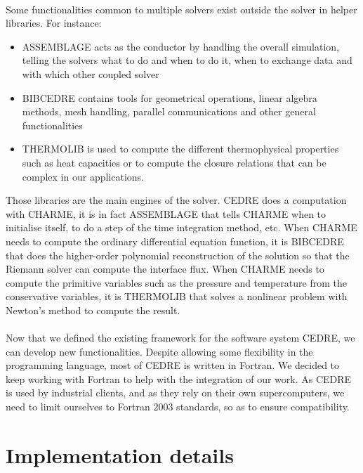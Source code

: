     \paragraph{}
    Some functionalities common to multiple solvers exist outside the solver in helper libraries.
    For instance:
    \begin{itemize}
      \item ASSEMBLAGE acts as the conductor by handling the overall simulation, telling the solvers what to do and when to do it, when to exchange data and with which other coupled solver
      \item BIBCEDRE contains tools for geometrical operations, linear algebra methods, mesh handling, parallel communications and other general functionalities
      \item THERMOLIB is used to compute the different thermophysical properties such as heat capacities or to compute the closure relations that can be complex in our applications.
    \end{itemize}
    Those libraries are the main engines of the solver.
    CEDRE does a computation with CHARME, it is in fact ASSEMBLAGE that tells CHARME when to initialise itself, to do a step of the time integration method, etc.
    When CHARME needs to compute the ordinary differential equation function, it is BIBCEDRE that does the higher-order polynomial reconstruction of the solution so that the Riemann solver can compute the interface flux.
    When CHARME needs to compute the primitive variables such as the pressure and temperature from the conservative variables, it is THERMOLIB that solves a nonlinear problem with Newton's method to compute the result.

    \paragraph{}
    Now that we defined the existing framework for the software system CEDRE, we can develop new functionalities.
    Despite allowing some flexibility in the programming language, most of CEDRE is written in Fortran.
    We decided to keep working with Fortran to help with the integration of our work.
    As CEDRE is used by industrial clients, and as they rely on their own supercomputers, we need to limit ourselves to Fortran 2003 standards, so as to ensure compatibility.


  \section{Implementation details}


